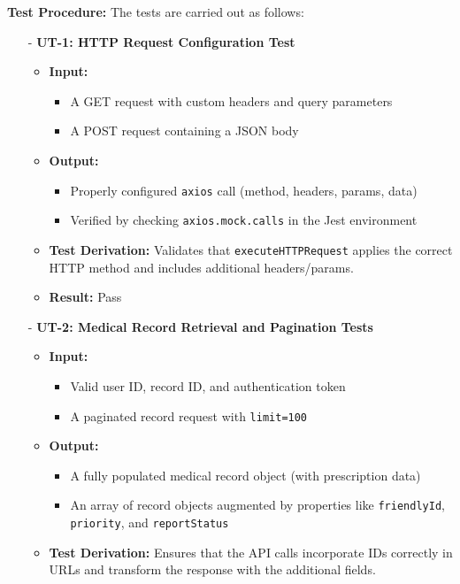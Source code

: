 \documentclass[12pt, titlepage]{article}
\begin{document}
\noindent \textbf{Test Procedure:} The tests are carried out as follows:
\begin{itemize}
    \item[-] \textbf{UT-1: HTTP Request Configuration Test} \label{test:frontend-http-request-config}
    \begin{itemize}
        \item \textbf{Input:} 
        \begin{itemize}
          \item A GET request with custom headers and query parameters
          \item A POST request containing a JSON body
        \end{itemize}
        \item \textbf{Output:} 
        \begin{itemize}
          \item Properly configured \texttt{axios} call (method, headers, params, data)
          \item Verified by checking \texttt{axios.mock.calls} in the Jest environment
        \end{itemize}
        \item \textbf{Test Derivation:}  
        Validates that \texttt{executeHTTPRequest} applies the correct HTTP method and includes additional headers/params.
        \item \textbf{Result:}  
        Pass
    \end{itemize}

    \item[-] \textbf{UT-2: Medical Record Retrieval and Pagination Tests} \label{test:frontend-medrec}
    \begin{itemize}
        \item \textbf{Input:} 
        \begin{itemize}
          \item Valid user ID, record ID, and authentication token
          \item A paginated record request with \texttt{limit=100}
        \end{itemize}
        \item \textbf{Output:} 
        \begin{itemize}
          \item A fully populated medical record object (with prescription data)
          \item An array of record objects augmented by properties like \texttt{friendlyId}, \texttt{priority}, and \texttt{reportStatus}
        \end{itemize}
        \item \textbf{Test Derivation:}  
        Ensures that the API calls incorporate IDs correctly in URLs and transform the response with the additional fields.
    \end{itemize}


\end{itemize}
\end{document}
